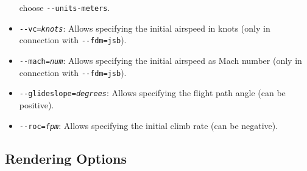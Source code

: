 \begin{itemize}
choose \texttt{-$ $-units-meters}.
\item{\texttt{-$ $-vc={\it knots}}}: Allows specifying the initial airspeed in knots
(only in connection with  \texttt{-$ $-fdm=jsb}).
\item{\texttt{-$ $-mach={\it num}}}: Allows specifying the initial airspeed as Mach
number (only in connection with  \texttt{-$ $-fdm=jsb}).
\item{\texttt{-$ $-glideslope={\it degrees}}}: Allows specifying the flight path angle (can be positive).
\item{\texttt{-$ $-roc={\it fpm}}}: Allows specifying the initial climb rate (can be negative).
\end{itemize}
\subsection{Rendering Options}
